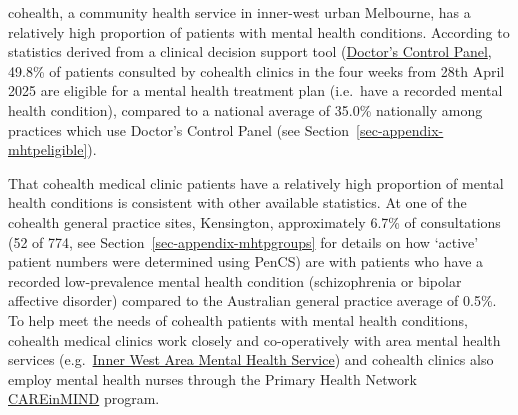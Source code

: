 \documentclass[
  letterpaper,
  DIV=11,
  numbers=noendperiod,
  oneside]{scrartcl}
\begin{document}
cohealth, a community health service in inner-west urban Melbourne, has
a relatively high proportion of patients with mental health conditions.
According to statistics derived from a clinical decision support tool
(\href{https://www.doctorscontrolpanel.com.au/}{Doctor's Control Panel},
49.8\% of patients consulted by cohealth clinics in the four weeks from
28th April 2025 are eligible for a mental health treatment plan
(i.e.~have a recorded mental health condition), compared to a national
average of 35.0\% nationally among practices which use Doctor's Control
Panel (see Section~\ref{sec-appendix-mhtpeligible}).

That cohealth medical clinic patients have a relatively high proportion
of mental health conditions is consistent with other available
statistics. At one of the cohealth general practice sites, Kensington,
approximately 6.7\% of consultations (52 of 774, see
Section~\ref{sec-appendix-mhtpgroups} for details on how `active'
patient numbers were determined using PenCS) are with patients who have
a recorded low-prevalence mental health condition (schizophrenia or
bipolar affective disorder) compared to the Australian general practice
average of 0.5\%. To help meet the needs of cohealth patients with mental health
conditions, cohealth medical clinics work closely and co-operatively
with area mental health services
(e.g.~\href{https://vahi.vic.gov.au/mental-health-services/inner-west-adult-area-mental-health-service}{Inner
West Area Mental Health Service}) and cohealth clinics also employ
mental health nurses through the Primary Health Network
\href{https://nwmphn.org.au/our-work/mental-health/careinmind-mental-health-services/}{CAREinMIND}
program.
\end{document}
